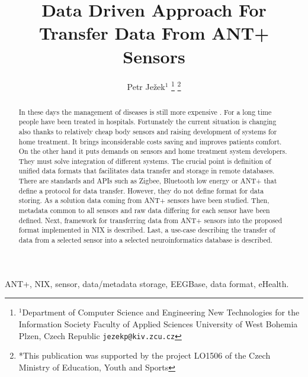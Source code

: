 \documentclass[conference]{IEEEtran}
\begin{document}
  \title{Data Driven Approach For Transfer Data  From ANT+ Sensors}

  \author{{Petr Je\v{z}ek$^{1}$}
\thanks{$^{1}$Department of Computer Science and Engineering
New Technologies for the Information Society
Faculty of Applied Sciences
University of West Bohemia
Plzen, Czech Republic
        {\tt\small jezekp@kiv.zcu.cz}}%
\thanks{*This publication was supported by the project LO1506 of the Czech Ministry of Education, Youth and Sports}%
}
\maketitle



\begin{abstract}
In these days the management of diseases is still more expensive . For a long time people have been treated in hospitals. Fortunately the current situation is changing also thanks to relatively cheap body sensors and raising development of systems for home treatment. It brings inconsiderable costs saving and improves patients comfort. On the other hand it puts demands on sensors and home treatment system developers. They must solve integration of different systems. The crucial point is definition of unified data formats that facilitates data transfer and storage in remote databases. There are standards and APIs such as Zigbee, Bluetooth low energy or ANT+ that define a protocol for data transfer. However, they do not define format for data storing. As a solution data coming from ANT+ sensors have been studied. Then, metadata common to all sensors and raw data differing for each sensor have been defined. Next, framework for transferring data from ANT+ sensors into the proposed format implemented in NIX is described. Last, a use-case describing the transfer of data from a selected sensor into a selected neuroinformatics database is described.



\end{abstract}

\begin{IEEEkeywords}
ANT+, NIX, sensor, data/metadata storage, EEGBase, data format, eHealth.
\end{IEEEkeywords}
\end{document}

